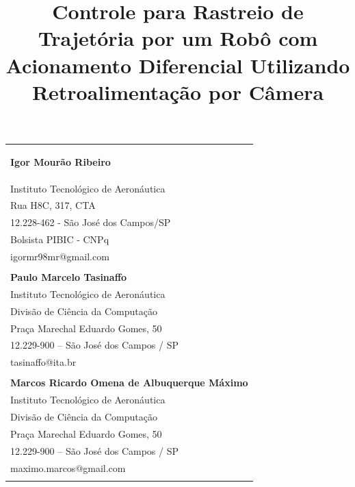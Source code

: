 \documentclass[10pt,fleqn,a4paper]{article}
\begin{document}
    
	{
	}
    \thispagestyle{firststyle}
    \vspace{-.5cm}
    \hspace{-.8cm}
    \begin{tabular}{p{\textwidth}}
    \begin{center}
    \vspace{-.6cm}
    \title{Controle para Rastreio de Trajetória por um Robô com Acionamento Diferencial Utilizando Retroalimentação por Câmera}
    \end{center}
    \textbf{Igor Mourão Ribeiro}\\
    \small{Instituto Tecnológico de Aeronáutica}\\
    \small{Rua H8C, 317, CTA}\\
    \small{12.228-462 - São José dos Campos/SP}\\
    \small{Bolsista PIBIC - CNPq}\\
    \small{igormr98mr@gmail.com}\\
    \\ 
    \textbf{Paulo Marcelo Tasinaffo}\\
    \small{Instituto Tecnológico de Aeronáutica}\\
    \small{Divisão de Ciência da Computação}\\
    \small{Praça Marechal Eduardo Gomes, 50}\\
    \small{12.229-900 – São José dos Campos / SP}\\
    \small{tasinaffo@ita.br}\\
    \\ 
    \textbf{Marcos Ricardo Omena de Albuquerque Máximo}\\
    \small{Instituto Tecnológico de Aeronáutica}\\
    \small{Divisão de Ciência da Computação}\\
    \small{Praça Marechal Eduardo Gomes, 50}\\
    \small{12.229-900 – São José dos Campos / SP}\\
    \small{maximo.marcos@gmail.com}\\
    \\

\end{tabular}
\end{document}
